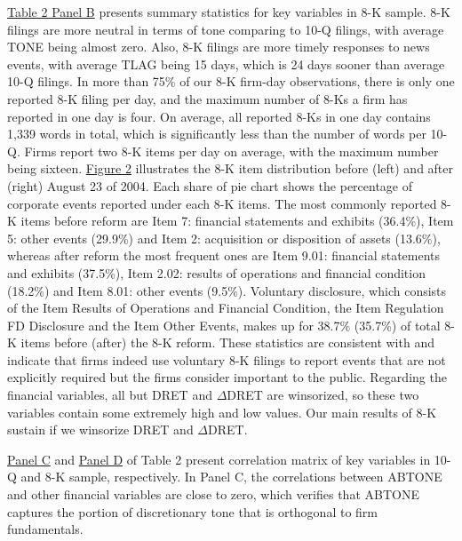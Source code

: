 \documentclass[a4paper]{article}
\begin{document}
\begin{spacing}{2}
\hyperref[T2PB]{Table 2 Panel B} presents summary statistics for key variables in 8-K sample. 8-K filings are more neutral in terms of tone comparing to 10-Q filings, with average TONE being almost zero. Also, 8-K filings are more timely responses to news events, with average TLAG being 15 days, which is 24 days sooner than average 10-Q filings. In more than 75\% of our 8-K firm-day observations, there is only one reported 8-K filing per day, and the maximum number of 8-Ks a firm has reported in one day is four. On average, all reported 8-Ks in one day contains 1,339 words in total, which is significantly less than the number of words per 10-Q. Firms report two 8-K items per day on average, with the maximum number being sixteen. \hyperref[fig2]{Figure 2} illustrates the 8-K item distribution before (left) and after (right) August 23 of 2004. Each share of pie chart shows the percentage of corporate events reported under each 8-K items. The most commonly reported 8-K items before reform are Item 7: financial statements and exhibits (36.4\%), Item 5: other events (29.9\%) and Item 2: acquisition or disposition of assets (13.6\%), whereas after reform the most frequent ones are Item 9.01: financial statements and exhibits (37.5\%), Item 2.02: results of operations and financial condition (18.2\%) and Item 8.01: other events (9.5\%). Voluntary disclosure, which consists of the Item Results of Operations and Financial Condition, the Item Regulation FD Disclosure and the Item Other Events, makes up for 38.7\% (35.7\%) of total 8-K items before (after) the 8-K reform. These statistics are consistent with  and indicate that firms indeed use voluntary 8-K filings to report events that are not explicitly required but the firms consider important to the public. Regarding the financial variables, all but DRET and $\Delta$DRET are winsorized, so these two variables contain some extremely high and low values. Our main results of 8-K sustain if we winsorize DRET and $\Delta$DRET.

\hyperref[T2PC]{Panel C} and \hyperref[T2PD]{Panel D} of Table 2 present correlation matrix of key variables in 10-Q and 8-K sample, respectively. In Panel C, the correlations between ABTONE and other financial variables are close to zero, which verifies that ABTONE captures the portion of discretionary tone that is orthogonal to firm fundamentals. 


\end{spacing}
\end{document}
